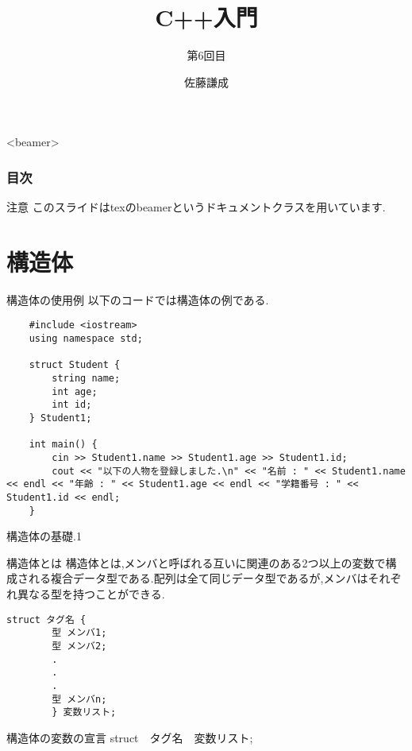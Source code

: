 \documentclass[xdvipdfmx, 8pt, t]{beamer}
\title{C++入門}
\subtitle{第6回目}
\author{佐藤謙成}
\begin{document}
\begin{frame}
    \titlepage
\end{frame}

\begin{frame}<beamer>
\frametitle{目次}
    \tableofcontents[]
\end{frame}

\begin{frame}{注意}
    このスライドはtexのbeamerというドキュメントクラスを用いています.
\end{frame}

\section{構造体}

\begin{frame}[fragile]{構造体の使用例}
 以下のコードでは構造体の例である.   

\begin{lstlisting}
    #include <iostream>
    using namespace std;

    struct Student {
        string name;
        int age;
        int id;
    } Student1;

    int main() {
        cin >> Student1.name >> Student1.age >> Student1.id;
        cout << "以下の人物を登録しました.\n" << "名前 : " << Student1.name << endl << "年齢 : " << Student1.age << endl << "学籍番号 : " << Student1.id << endl;
    }
\end{lstlisting}
\end{frame}
\begin{frame}[fragile]{構造体の基礎.1}
    \begin{block}{構造体とは}
        構造体とは,メンバと呼ばれる互いに関連のある2つ以上の変数で構成される複合データ型である.配列は全て同じデータ型であるが,メンバはそれぞれ異なる型を持つことができる.
    \end{block}
    \begin{lstlisting}[caption = 構造体の定義]
        struct タグ名 {
        型 メンバ1;
        型 メンバ2;
        .
        .
        .
        型 メンバn;
        } 変数リスト;
    \end{lstlisting}
    \begin{block}{構造体の変数の宣言}
        struct　タグ名　変数リスト;
    \end{block}
\end{frame}
\end{document}
